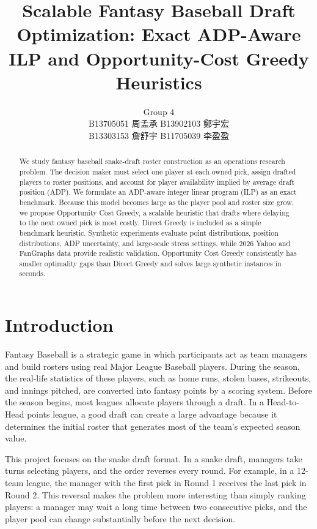 \documentclass[12pt]{article}
\title{\vspace{-2em}\textbf{Scalable Fantasy Baseball Draft Optimization: Exact ADP-Aware ILP and Opportunity-Cost Greedy Heuristics}}
\author{
Group 4\\[0.25em]
B13705051 周孟承 \quad
B13902103 鄭宇宏\\
B13303153 詹舒宇 \quad
B11705039 李盈盈
}
\date{}
\begin{document}
\maketitle
\vspace{-1.6em}

\begin{abstract}
We study fantasy baseball snake-draft roster construction as an operations research problem. The decision maker must select one player at each owned pick, assign drafted players to roster positions, and account for player availability implied by average draft position (ADP). We formulate an ADP-aware integer linear program (ILP) as an exact benchmark. Because this model becomes large as the player pool and roster size grow, we propose Opportunity Cost Greedy, a scalable heuristic that drafts where delaying to the next owned pick is most costly. Direct Greedy is included as a simple benchmark heuristic. Synthetic experiments evaluate point distributions, position distributions, ADP uncertainty, and large-scale stress settings, while 2026 Yahoo and FanGraphs data provide realistic validation. Opportunity Cost Greedy consistently has smaller optimality gaps than Direct Greedy and solves large synthetic instances in seconds.
\end{abstract}

\section{Introduction}
Fantasy Baseball is a strategic game in which participants act as team managers and build rosters using real Major League Baseball players. During the season, the real-life statistics of these players, such as home runs, stolen bases, strikeouts, and innings pitched, are converted into fantasy points by a scoring system. Before the season begins, most leagues allocate players through a draft. In a Head-to-Head points league, a good draft can create a large advantage because it determines the initial roster that generates most of the team's expected season value.

This project focuses on the snake draft format. In a snake draft, managers take turns selecting players, and the order reverses every round. For example, in a 12-team league, the manager with the first pick in Round 1 receives the last pick in Round 2. This reversal makes the problem more interesting than simply ranking players: a manager may wait a long time between two consecutive picks, and the player pool can change substantially before the next decision.
\end{document}
